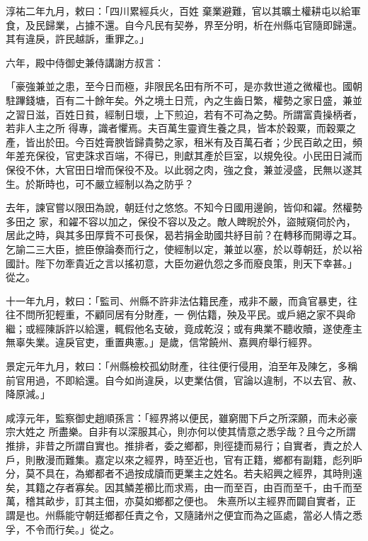 \begin{pinyinscope}
 淳祐二年九月，敕曰：「四川累經兵火，百姓
 棄業避難，官以其曠土權耕屯以給軍食，及民歸業，占據不還。自今凡民有契券，界至分明，析在州縣屯官隨即歸還。其有違戾，許民越訴，重罪之。」



 六年，殿中侍御史兼侍講謝方叔言：



 「豪強兼並之患，至今日而極，非限民名田有所不可，是亦救世道之微權也。國朝駐蹕錢塘，百有二十餘年矣。外之境土日荒，內之生齒日繁，權勢之家日盛，兼並之習日滋，百姓日貧，經制日壞，上下煎迫，若有不可為之勢。所謂富貴操柄者，若非人主之所
 得專，識者懼焉。夫百萬生靈資生養之具，皆本於穀粟，而穀粟之產，皆出於田。今百姓膏腴皆歸貴勢之家，租米有及百萬石者；少民百畝之田，頻年差充保役，官吏誅求百端，不得已，則獻其產於巨室，以規免役。小民田日減而保役不休，大官田日增而保役不及。以此弱之肉，強之食，兼並浸盛，民無以遂其生。於斯時也，可不嚴立經制以為之防乎？



 去年，諫官嘗以限田為說，朝廷付之悠悠。不知今日國用邊餉，皆仰和糴。然權勢多田之
 家，和糴不容以加之，保役不容以及之。敵人睥睨於外，盜賊窺伺於內，居此之時，與其多田厚貲不可長保，曷若捐金助國共紓目前？在轉移而開導之耳。乞諭二三大臣，摭臣僚論奏而行之，使經制以定，兼並以塞，於以尊朝廷，於以裕國計。陛下勿牽貴近之言以搖初意，大臣勿避仇怨之多而廢良策，則天下幸甚。」從之。



 十一年九月，敕曰：「監司、州縣不許非法估籍民產，戒非不嚴，而貪官暴吏，往往不問所犯輕重，不顧同居有分財產，一
 例估籍，殃及平民。或戶絕之家不與命繼；或經陳訴許以給還，輒假他名支破，竟成乾沒；或有典業不聽收贖，遂使產主無辜失業。違戾官吏，重置典憲。」是歲，信常饒州、嘉興府舉行經界。



 景定元年九月，敕曰：「州縣檢校孤幼財產，往往便行侵用，洎至年及陳乞，多稱前官用過，不即給還。自今如尚違戾，以吏業估償，官論以違制，不以去官、赦、降原減。」



 咸淳元年，監察御史趙順孫言：「經界將以便民，雖窮閻下戶之所深願，而未必豪宗大姓之
 所盡樂。自非有以深服其心，則亦何以使其情意之悉孚哉？且今之所謂推排，非昔之所謂自實也。推排者，委之鄉都，則徑捷而易行；自實者，責之於人戶，則散漫而難集。嘉定以來之經界，時至近也，官有正籍，鄉都有副籍，彪列昈分，莫不具在，為鄉都者不過按成牘而更業主之姓名。若夫紹興之經界，其時則遠矣，其籍之存者寡矣。因其鱗差櫛比而求焉，由一而至百，由百而至千，由千而至萬，稽其畝步，訂其主佃，亦莫如鄉都之便也。
 朱熹所以主經界而闢自實者，正謂是也。州縣能守朝廷鄉都任責之令，又隨諸州之便宜而為之區處，當必人情之悉孚，不令而行矣。」從之。




\end{pinyinscope}
